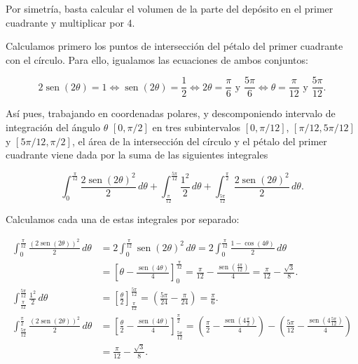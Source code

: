 \documentclass[
  a4paper,
]{scrreport}
\theoremstyle{definition}
\theoremstyle{remark}
\begin{document}
\begin{tcolorbox}[enhanced jigsaw, opacityback=0, bottomtitle=1mm, coltitle=black, opacitybacktitle=0.6, colback=white, breakable, left=2mm, titlerule=0mm, bottomrule=.15mm, colbacktitle=quarto-callout-tip-color!10!white, toprule=.15mm, leftrule=.75mm, arc=.35mm, toptitle=1mm, colframe=quarto-callout-tip-color-frame, title=\textcolor{quarto-callout-tip-color}{\faLightbulb}\hspace{0.5em}{Solución}, rightrule=.15mm]

Por simetría, basta calcular el volumen de la parte del depósito en el
primer cuadrante y multiplicar por 4.

Calculamos primero los puntos de intersección del pétalo del primer
cuadrante con el círculo. Para ello, igualamos las ecuaciones de ambos
conjuntos:

\[
2\operatorname{sen}(2\theta) = 1 \Leftrightarrow \operatorname{sen}(2\theta) = \frac{1}{2} \Leftrightarrow 2\theta = \frac{\pi}{6} \mbox{ y } \frac{5\pi}{6} \Leftrightarrow \theta = \frac{\pi}{12} \mbox{ y }\frac{5\pi}{12}.
\]

Así pues, trabajando en coordenadas polares, y descomponiendo intervalo
de integración del ángulo \(\theta\) \([0, \pi/2]\) en tres
subintervalos \([0,\pi/12]\), \([\pi/12, 5\pi/12]\) y
\([5\pi/12, \pi/2]\), el área de la intersección del círculo y el pétalo
del primer cuadrante viene dada por la suma de las siguientes integrales

\[
\int_0^{\frac{\pi}{12}} \frac{2\operatorname{sen}(2\theta)^2}{2}\,d\theta + \int_{\frac{\pi}{12}}^{\frac{5\pi}{12}} \frac{1^2}{2}\,d\theta + \int_{\frac{5\pi}{12}}^{\frac{\pi}{2}} \frac{2\operatorname{sen}(2\theta)^2}{2}\,d\theta.
\]

Calculamos cada una de estas integrales por separado:

\begin{align*}
\int_0^{\frac{\pi}{12}} \frac{(2\operatorname{sen}(2\theta))^2}{2}\,d\theta
&= 2\int_0^{\frac{\pi}{12}} \operatorname{sen}(2\theta)^2\,d\theta
= 2\int_0^{\frac{\pi}{12}} \frac{1 - \cos(4\theta)}{2}\,d\theta \\
&= \left[\theta - \frac{\operatorname{sen}(4\theta)}{4} \right]_0^{\frac{\pi}{12}}
= \frac{\pi}{12} - \frac{\operatorname{sen}(\frac{4\pi}{12})}{4}
= \frac{\pi}{12} - \frac{\sqrt{3}}{8}.\\
\int_{\frac{\pi}{12}}^{\frac{5\pi}{12}} \frac{1^2}{2}\,d\theta
&= \left[ \frac{\theta}{2} \right]_{\frac{\pi}{12}}^{\frac{5\pi}{12}}
= \left( \frac{5\pi}{24} - \frac{\pi}{24} \right)
= \frac{\pi}{6}.\\
\int_{\frac{5\pi}{12}}^{\frac{\pi}{2}} \frac{(2\operatorname{sen}(2\theta))^2}{2}\,d\theta 
&= \left[ \frac{\theta}{2} - \frac{\operatorname{sen}(4\theta)}{4} \right]_\frac{5\pi}{12}^{\frac{\pi}{2}} 
= \left( \frac{\pi}{2} - \frac{\operatorname{sen}(4\frac{\pi}{2})}{4} \right) - \left( \frac{5\pi}{12} - \frac{\operatorname{sen}(4\frac{5\pi}{12})}{4} \right) \\
&= \frac{\pi}{12} - \frac{\sqrt{3}}{8}.
\end{align*}


\end{tcolorbox}
\end{document}
